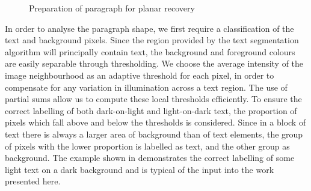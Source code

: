 \begin{figure}[t]
\begin{centering}
  \hspace*{1mm}
  \hspace*{1mm}
\label{runprep}
\caption{Preparation of paragraph for planar recovery}
\end{centering}
\end{figure}

In order to analyse the paragraph shape,
we first require a classification of the text and background pixels.
Since the region provided by the text segmentation algorithm
will principally contain text, the background and foreground colours are
easily separable through thresholding. We choose
the average intensity of the
image neighbourhood as an adaptive threshold for each pixel, in order to
compensate for any variation in illumination across a text region.
The use of partial sums \cite{partialSums}
allow us to compute these local thresholds efficiently.
To ensure the correct labelling of both dark-on-light and
light-on-dark text, the proportion of pixels which fall above
and below the thresholds is considered.
Since in a block of text there is always a larger area
of background than of text elements,
the group of pixels with the lower proportion is
labelled as text, and the other group as
background.
The example shown in  demonstrates the correct
labelling of some light text on a dark background and is typical of the
input into the work presented here.

